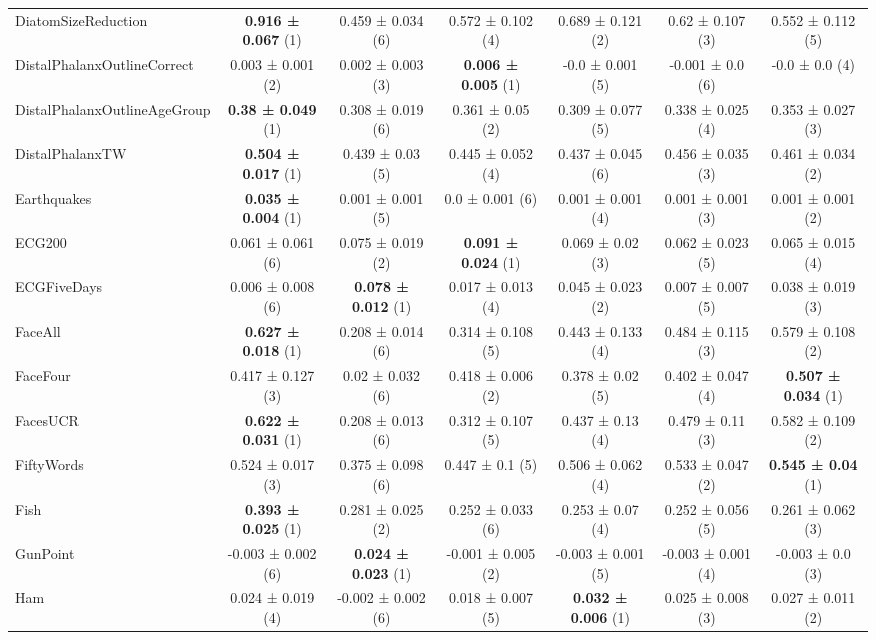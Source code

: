 \begin{table}[ht]
\begin{adjustbox}{width=\textwidth}
\begin{tabular}{lcccccc}
    DiatomSizeReduction & \textbf{0.916 ± 0.067} (1) & 0.459 ± 0.034 (6) & 0.572 ± 0.102 (4) & 0.689 ± 0.121 (2) & 0.62 ± 0.107 (3) & 0.552 ± 0.112 (5) \\
    DistalPhalanxOutlineCorrect & 0.003 ± 0.001 (2) & 0.002 ± 0.003 (3) & \textbf{0.006 ± 0.005} (1) & -0.0 ± 0.001 (5) & -0.001 ± 0.0 (6) & -0.0 ± 0.0 (4) \\
    DistalPhalanxOutlineAgeGroup & \textbf{0.38 ± 0.049} (1) & 0.308 ± 0.019 (6) & 0.361 ± 0.05 (2) & 0.309 ± 0.077 (5) & 0.338 ± 0.025 (4) & 0.353 ± 0.027 (3) \\
    DistalPhalanxTW & \textbf{0.504 ± 0.017} (1) & 0.439 ± 0.03 (5) & 0.445 ± 0.052 (4) & 0.437 ± 0.045 (6) & 0.456 ± 0.035 (3) & 0.461 ± 0.034 (2) \\
    Earthquakes & \textbf{0.035 ± 0.004} (1) & 0.001 ± 0.001 (5) & 0.0 ± 0.001 (6) & 0.001 ± 0.001 (4) & 0.001 ± 0.001 (3) & 0.001 ± 0.001 (2) \\
    ECG200 & 0.061 ± 0.061 (6) & 0.075 ± 0.019 (2) & \textbf{0.091 ± 0.024} (1) & 0.069 ± 0.02 (3) & 0.062 ± 0.023 (5) & 0.065 ± 0.015 (4) \\
    ECGFiveDays & 0.006 ± 0.008 (6) & \textbf{0.078 ± 0.012} (1) & 0.017 ± 0.013 (4) & 0.045 ± 0.023 (2) & 0.007 ± 0.007 (5) & 0.038 ± 0.019 (3) \\
    FaceAll & \textbf{0.627 ± 0.018} (1) & 0.208 ± 0.014 (6) & 0.314 ± 0.108 (5) & 0.443 ± 0.133 (4) & 0.484 ± 0.115 (3) & 0.579 ± 0.108 (2) \\
    FaceFour & 0.417 ± 0.127 (3) & 0.02 ± 0.032 (6) & 0.418 ± 0.006 (2) & 0.378 ± 0.02 (5) & 0.402 ± 0.047 (4) & \textbf{0.507 ± 0.034} (1) \\
    FacesUCR & \textbf{0.622 ± 0.031} (1) & 0.208 ± 0.013 (6) & 0.312 ± 0.107 (5) & 0.437 ± 0.13 (4) & 0.479 ± 0.11 (3) & 0.582 ± 0.109 (2) \\
    FiftyWords & 0.524 ± 0.017 (3) & 0.375 ± 0.098 (6) & 0.447 ± 0.1 (5) & 0.506 ± 0.062 (4) & 0.533 ± 0.047 (2) & \textbf{0.545 ± 0.04} (1) \\
    Fish & \textbf{0.393 ± 0.025} (1) & 0.281 ± 0.025 (2) & 0.252 ± 0.033 (6) & 0.253 ± 0.07 (4) & 0.252 ± 0.056 (5) & 0.261 ± 0.062 (3) \\
    GunPoint & -0.003 ± 0.002 (6) & \textbf{0.024 ± 0.023} (1) & -0.001 ± 0.005 (2) & -0.003 ± 0.001 (5) & -0.003 ± 0.001 (4) & -0.003 ± 0.0 (3) \\
    Ham & 0.024 ± 0.019 (4) & -0.002 ± 0.002 (6) & 0.018 ± 0.007 (5) & \textbf{0.032 ± 0.006} (1) & 0.025 ± 0.008 (3) & 0.027 ± 0.011 (2) \\

\end{tabular}
\end{adjustbox}
\end{table}
